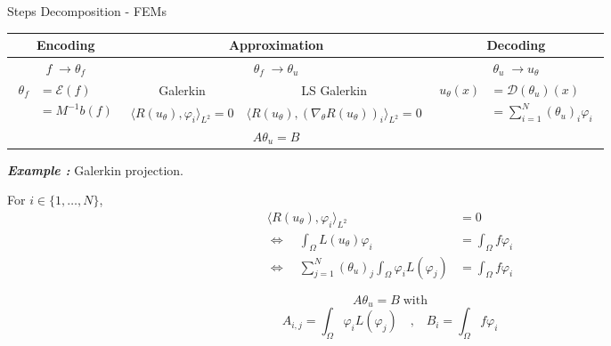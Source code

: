 \begin{frame}{Steps Decomposition - FEMs}
	\begin{center}
		\renewcommand{\arraystretch}{1.5}
		\begin{tabular}{|c|c|c|c|}
			\hline
			\textbf{Encoding} & \multicolumn{2}{c|}{\textbf{Approximation}} & \textbf{Decoding} \\
			\hline
			$f \; \rightarrow \theta_f$ & \multicolumn{2}{c|}{$\theta_f \; \rightarrow \theta_u$} & $\theta_u \; \rightarrow u_\theta$ \\
			\hline
			\multirow{3}{*}{$\begin{aligned}
				\theta_f&=\mathcal{E}(f) \\
				&=M^{-1}b(f)
			\end{aligned}$} & Galerkin & LS Galerkin & \multirow{3}{*}{$\begin{aligned}
				u_\theta(x)&=\mathcal{D}(\theta_u)(x) \\
				&=\sum_{i=1}^N (\theta_u)_i\varphi_i
			\end{aligned}$} \\
			 & \small $\langle R(u_\theta),\varphi_i\rangle_{L^2}=0$ & \small $\langle R(u_\theta),(\nabla_\theta R(u_\theta))_i\rangle_{L^2}=0$ & \\
			\cline{2-3}
			 & \multicolumn{2}{c|}{$A\theta_u=B$} & \\
			 \hline
		\end{tabular}
	\end{center}

	\footnotesize
	\textit{\textbf{Example :}} Galerkin projection.
	
	\begin{minipage}{0.48\linewidth}
		For $i\in\{1,\dots,N\}$,
		\begin{align*}
			\langle R(u_\theta),\varphi_i\rangle_{L^2}&=0 \\
			\iff \quad \int_\Omega L(u_\theta)\varphi_i &= \int_\Omega f\varphi_i \\
			\iff \quad \sum_{j=1}^N(\theta_u)_j \int_\Omega \varphi_i L(\varphi_j) &= \int_\Omega f\varphi_i
		\end{align*}
	\end{minipage}
	\begin{minipage}{0.48\linewidth}
		\begin{equation*}
			A\theta_u=B \; \text{with}
		\end{equation*}
		\begin{equation*}
			A_{i,j} = \int_\Omega \varphi_i L(\varphi_j) \quad \text{,} \quad B_i =  \int_\Omega f\varphi_i
		\end{equation*}
	\end{minipage}
\end{frame}